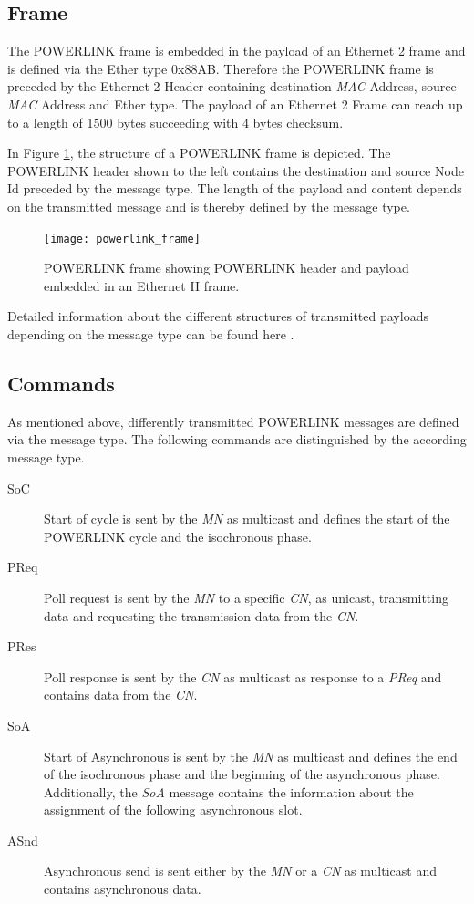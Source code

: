 \subsection{Frame}
\label{sec:oplk_powerlink_frame}
The POWERLINK frame is embedded in the payload of an Ethernet 2 frame and is defined via the Ether type 0x88AB.
Therefore the POWERLINK frame is preceded by the Ethernet 2 Header containing destination \emph{MAC} Address, source \emph{MAC} Address and Ether type.
The payload of an Ethernet 2 Frame can reach up to a length of 1500 bytes succeeding with 4 bytes checksum. \cite[section 3.2]{ethernet_ieee_2016} \cite[section 4.6.1]{epsg_epsg_2013}

In Figure \ref{fig:powerlink_frame}, the structure of a POWERLINK frame is depicted.
The POWERLINK header shown to the left contains the destination and source Node Id preceded by the message type.
The length of the payload and content depends on the transmitted message and is thereby defined by the message type. \cite[section 4.6.1.1]{epsg_epsg_2013}

\begin{figure}
    \centering
    \texttt{[image: powerlink\_frame]}
    \caption{POWERLINK frame showing POWERLINK header and payload embedded in an Ethernet II frame.}
    \label{fig:powerlink_frame}
\end{figure}

Detailed information about the different structures of transmitted payloads depending on the message type can be found here \cite[section 4.6.1.1.1]{epsg_epsg_2013}.

\subsection{Commands}
\label{sec:oplk_powerlink_commands}

As mentioned above, differently transmitted POWERLINK messages are defined via the message type.
The following commands are distinguished by the according message type.

\begin{description}
    \item[SoC] Start of cycle is sent by the \emph{MN} as multicast and defines the start of the POWERLINK cycle and the isochronous phase.
    \item[PReq] Poll request is sent by the \emph{MN} to a specific \emph{CN}, as unicast, transmitting data and requesting the transmission data from the \emph{CN}.
    \item[PRes] Poll response is sent by the \emph{CN} as multicast as response to a \emph{PReq} and contains data from the \emph{CN}.
    \item[SoA] Start of Asynchronous is sent by the \emph{MN} as multicast and defines the end of the isochronous phase and the beginning of the asynchronous phase.
    Additionally, the \emph{SoA} message contains the information about the assignment of the following asynchronous slot.
    \item[ASnd] Asynchronous send is sent either by the \emph{MN} or a \emph{CN} as multicast and contains asynchronous data.
\end{description}

